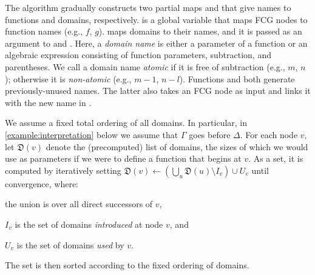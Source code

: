 \documentclass{article}
\begin{document}
The algorithm gradually constructs two partial maps \functionNames and
\domainNames that give names to functions and domains, respectively.
\functionNames is a global variable that maps FCG nodes to function names (e.g.,
$f$, $g$). \domainNames maps domains to their names, and it is passed as an
argument to \visit and \actuallyVisit. Here, a \emph{domain name} is either a
parameter of a function or an algebraic expression consisting of function
parameters, subtraction, and parentheses. We call a domain name \emph{atomic} if
it is free of subtraction (e.g., $m$, $n$); otherwise it is \emph{non-atomic}
(e.g., $m-1$, $n-l$). Functions \newDomainName and \newFunctionName both
generate previously-unused names. The latter also takes an FCG node as input and
links it with the new name in \functionNames.

We assume a fixed total ordering of all domains. In particular, in
\cref{example:interpretation} below we assume that $\Gamma$ goes before
$\Delta$. For each node $v$, let $\mathfrak{D}(v)$ denote the (precomputed) list
of domains, the sizes of which we would use as parameters if we were to define a
function that begins at $v$. As a set, it is computed by iteratively setting
$\mathfrak{D}(v) \gets \left(\bigcup_{u} \mathfrak{D}(u) \setminus I_{v}\right) \cup U_{v}$
until convergence, where:
\begin{enumerate*}[label=(\roman*)]
  \item the union is over all direct successors of $v$,
  \item $I_{v}$ is the set of domains \emph{introduced} at node $v$, and
  \item $U_{v}$ is the set of domains \emph{used} by $v$.
\end{enumerate*}
The set is then sorted according to the fixed ordering of domains.
\end{document}
